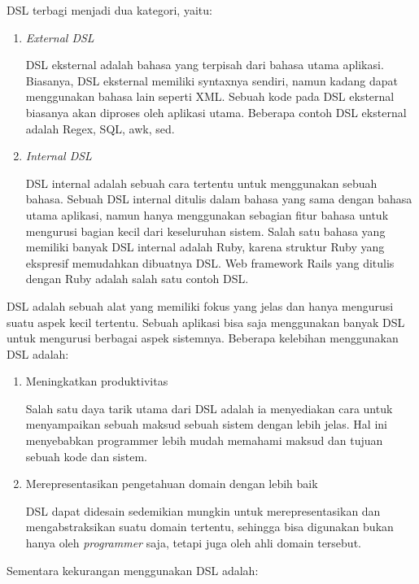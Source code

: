 DSL terbagi menjadi dua kategori, yaitu:

\begin{enumerate}
    \item \emph{External DSL}

    DSL eksternal adalah bahasa yang terpisah dari bahasa utama aplikasi.
    Biasanya, DSL eksternal memiliki syntaxnya sendiri, namun kadang dapat menggunakan
    bahasa lain seperti XML. Sebuah kode pada DSL eksternal biasanya akan diproses oleh
    aplikasi utama. Beberapa contoh DSL eksternal adalah Regex, SQL, awk, sed.

    \item \emph{Internal DSL}
    
    DSL internal adalah sebuah cara tertentu untuk menggunakan sebuah bahasa.
    Sebuah DSL internal ditulis dalam bahasa yang sama dengan bahasa utama aplikasi,
    namun hanya menggunakan sebagian fitur bahasa untuk mengurusi bagian kecil 
    dari keseluruhan sistem. Salah satu bahasa yang memiliki banyak DSL internal adalah Ruby,
    karena struktur Ruby yang ekspresif memudahkan dibuatnya DSL.
    Web framework Rails yang ditulis dengan Ruby adalah salah satu contoh DSL.
\end{enumerate}

DSL adalah sebuah alat yang memiliki fokus yang jelas dan hanya mengurusi suatu
aspek kecil tertentu. Sebuah aplikasi bisa saja menggunakan banyak DSL untuk mengurusi
berbagai aspek sistemnya. Beberapa kelebihan menggunakan DSL adalah:

\begin{enumerate}
    \item Meningkatkan produktivitas

    Salah satu daya tarik utama dari DSL adalah ia menyediakan cara untuk menyampaikan
    sebuah maksud sebuah sistem dengan lebih jelas.
    Hal ini menyebabkan programmer lebih mudah memahami maksud dan
    tujuan sebuah kode dan sistem.

    \item Merepresentasikan pengetahuan domain dengan lebih baik

    DSL dapat didesain sedemikian mungkin untuk merepresentasikan dan mengabstraksikan
    suatu domain tertentu, sehingga
    bisa digunakan bukan hanya oleh \emph{programmer} saja, tetapi juga oleh ahli domain tersebut.
\end{enumerate}

Sementara kekurangan menggunakan DSL adalah:

